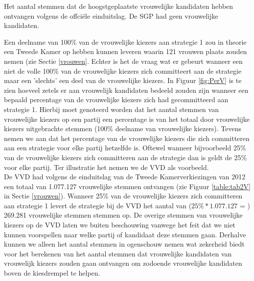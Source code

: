 \begin{table}[H]
\centering
	\begin{footnotesize}
		
	\end{footnotesize}
			\caption{Het aantal stemmen dat de hoogstgeplaatste vrouwelijke kandidaten hebben ontvangen volgens de offci\"{e}le einduitslag. De SGP had geen vrouwelijke kandidaten.}
\label{table:HoogstV} 
\end{table} 

\indent Een deelname van 100\% van de vrouwelijke kiezers aan strategie 1 zou in theorie een Tweede Kamer op hebben kunnen leveren waarin 121 vrouwen plaats zouden nemen (zie Sectie \ref{vrouwen}. Echter is het de vraag wat er gebeurt wanneer een niet de volle 100\% van de vrouwelijke kiezers zich committeert aan de strategie maar een 'slechts' een deel van de vrouwelijke kiezers. In Figuur \ref{fig:PerV} is te zien hoeveel zetels er aan vrouwelijk kandidaten bedeeld zouden zijn wanneer een bepaald percentage van de vrouwelijke kiezers zich had gecommitteerd aan strategie 1. Hierbij moet genoteerd worden dat het aantal stemmen van vrouwelijke kiezers op een partij een percentage is van het totaal door vrouwelijke kiezers uitgebrachte stemmen (100\% deelname van vrouwelijke kiezers). Tevens nemen we aan dat het percentage van de vrouwelijke kiezers die zich committeren aan een strategie voor elke partij hetzelfde is. Oftewel wanneer bijvoorbeeld 25\% van de vrouwelijke kiezers zich committeren aan de strategie dan is geldt de 25\% voor elke partij. Ter illustratie het nemen we de VVD als voorbeeld.\\
\indent De VVD had volgens de einduitslag van de Tweede Kamerverkiezingen van 2012 een totaal van 1.077.127 vrouwelijke stemmen ontvangen (zie Figuur \ref{table:tab2V} in Sectie \ref{vrouwen}). Wanneer 25\% van de vrouwelijke kiezers zich committeren aan strategie 1 levert de strategie bij de VVD het aantal van ($25\%*1.077.127$ = ) 269.281 vrouwelijke stemmen stemmen op. De overige stemmen van vrouwelijke kiezers op de VVD laten we buiten beschouwing vanwege het feit dat we niet kunnen voorspellen naar welke partij of kandidaat deze stemmen gaan. Derhalve kunnen we alleen het aantal stemmen in ogenschouw nemen wat zekerheid biedt voor het berekenen van het aantal stemmen dat vrouwelijke kandidaten van vrouwelijk kiezers zouden gaan ontvangen om zodoende vrouwelijke kandidaten boven de kiesdrempel te helpen.  



